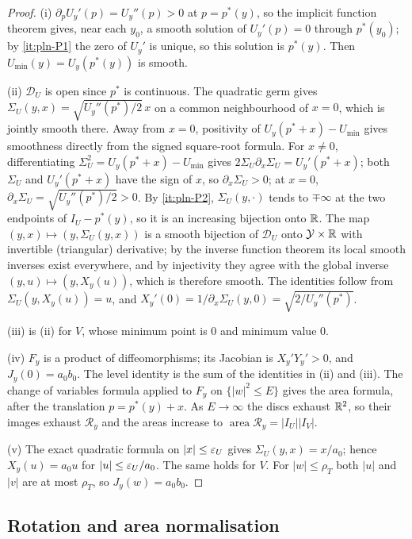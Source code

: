 \begin{proof}
(i) $\partial_pU_y'(p)=U_y''(p)>0$ at $p=p^*(y)$, so the implicit function theorem gives, near each
$y_0$, a smooth solution of $U_y'(p)=0$ through $p^*(y_0)$; by \ref{it:pln-P1} the zero of $U_y'$ is
unique, so this solution is $p^*(y)$. Then $U_{\min}(y)=U_y(p^*(y))$ is smooth.

(ii) $\mathcal D_U$ is open since $p^*$ is continuous. The quadratic
germ gives $\Sigma_U(y,x)=\sqrt{U_y''(p^*)/2}\,x$ on a common neighbourhood
of $x=0$, which is jointly smooth there. Away from $x=0$, positivity of
$U_y(p^*+x)-U_{\min}$ gives smoothness directly from the signed square-root
formula. For $x\ne0$,
differentiating $\Sigma_U^2=U_y(p^*+x)-U_{\min}$ gives $2\Sigma_U\partial_x\Sigma_U=U_y'(p^*+x)$; both
$\Sigma_U$ and $U_y'(p^*+x)$ have the sign of $x$, so $\partial_x\Sigma_U>0$; at $x=0$,
$\partial_x\Sigma_U=\sqrt{U_y''(p^*)/2}>0$. By \ref{it:pln-P2}, $\Sigma_U(y,\cdot)$
tends to $\mp\infty$ at the two endpoints of $I_U-p^*(y)$, so it is an increasing bijection onto $\mathbb{R}$.
The map $(y,x)\mapsto(y,\Sigma_U(y,x))$ is a smooth bijection of $\mathcal D_U$ onto
$\mathcal Y\times\mathbb{R}$ with invertible (triangular) derivative; by the inverse function theorem its local
smooth inverses exist everywhere, and by injectivity they agree with the global inverse
$(y,u)\mapsto(y,X_y(u))$, which is therefore smooth. The identities follow from
$\Sigma_U(y,X_y(u))=u$, and $X_y'(0)=1/\partial_x\Sigma_U(y,0)=\sqrt{2/U_y''(p^*)}$.

(iii) is (ii) for $V$, whose minimum point is $0$ and minimum value $0$.

(iv) $F_y$ is a product of diffeomorphisms; its Jacobian is $X_y'Y_y'>0$, and $J_y(0)=a_0b_0$. The level
identity is the sum of the identities in (ii) and (iii). The change of variables formula applied to
$F_y$ on $\{|w|^2\le E\}$ gives the area formula, after the translation $p=p^*(y)+x$. As $E\to\infty$ the
discs exhaust $\mathbb{R}^2$, so their images exhaust $\mathcal R_y$ and the areas increase to
$\operatorname{area}\mathcal R_y=|I_U||I_V|$.

(v) The exact quadratic formula on $|x|\le\varepsilon_U$ gives $\Sigma_U(y,x)=x/a_0$; hence $X_y(u)=a_0u$ for $|u|\le\varepsilon_U/a_0$.
The same holds for $V$. For $|w|\le\rho_T$ both $|u|$ and $|v|$ are at most $\rho_T$, so
$J_y(w)=a_0b_0$.
\end{proof}

\subsection{Rotation and area normalisation}\label{sec:pln-normalisation-maps}

